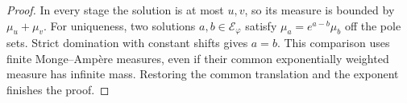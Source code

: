 \begin{proof}
In every stage the solution is at most $u,v$, so its measure is bounded by $\mu_u+\mu_v$. For uniqueness, two solutions $a,b\in\mathcal E_\varphi$ satisfy $\mu_a=e^{a-b}\mu_b$ off the pole sets. Strict domination with constant shifts gives $a=b$. This comparison uses finite Monge--Amp\`ere measures, even if their common exponentially weighted measure has infinite mass. Restoring the common translation and the exponent finishes the proof.
\end{proof}
